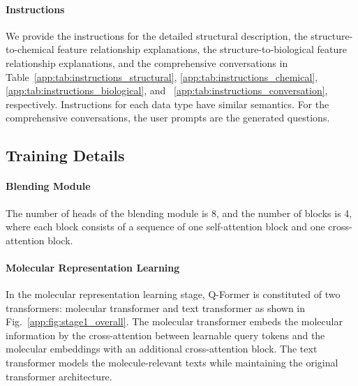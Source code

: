 \vspace{-0.07in}
\paragraph{Instructions}
We provide the instructions for the detailed structural description, the structure-to-chemical feature relationship explanations, the structure-to-biological feature relationship explanations, and the comprehensive conversations in Table~\ref{app:tab:instructions_structural}, \ref{app:tab:instructions_chemical}, \ref{app:tab:instructions_biological}, and ~\ref{app:tab:instructions_conversation}, respectively. Instructions for each data type have similar semantics. For the comprehensive conversations, the user prompts are the generated questions.

\vspace{-0.07in}
\subsection{Training Details\label{app:sec:training_details}}
\vspace{-0.07in}
\paragraph{Blending Module}
The number of heads of the blending module is 8, and the number of blocks is 4, where each block consists of a sequence of one self-attention block and one cross-attention block.

\vspace{-0.07in}
\paragraph{Molecular Representation Learning\label{app:sec:stage1_details}}
In the molecular representation learning stage, Q-Former is constituted of two transformers: molecular transformer and text transformer as shown in Fig.~\ref{app:fig:stage1_overall}. The molecular transformer embeds the molecular information by the cross-attention between learnable query tokens and the molecular embeddings with an additional cross-attention block. The text transformer models the molecule-relevant texts while maintaining the original transformer architecture.

